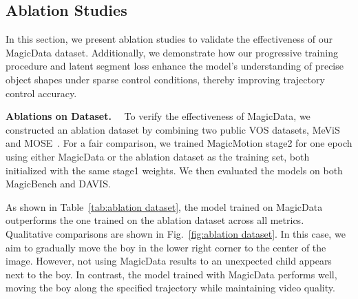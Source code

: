 \subsection{Ablation Studies}
In this section, we present ablation studies to validate the effectiveness of our MagicData dataset. Additionally, we demonstrate how our progressive training procedure and latent segment loss enhance the model’s understanding of precise object shapes under sparse control conditions, thereby improving trajectory control accuracy.

\vspace{0.2cm}
\noindent\textbf{Ablations on Dataset.}
~~To verify the effectiveness of MagicData, we constructed an ablation dataset by combining two public VOS datasets, MeViS~\cite{MeViS} and MOSE~\cite{MOSE}.
For a fair comparison, we trained MagicMotion stage2 for one epoch using either MagicData or the ablation dataset as the training set, both initialized with the same stage1 weights. We then evaluated the models on both MagicBench and DAVIS.

As shown in Table~\ref{tab:ablation dataset}, the model trained on MagicData outperforms the one trained on the ablation dataset across all metrics. Qualitative comparisons are shown in Fig.~\ref{fig:ablation dataset}. In this case, we aim to gradually move the boy in the lower right corner to the center of the image. However, not using MagicData results to an unexpected child appears next to the boy.
In contrast, the model trained with MagicData performs well, moving the boy along the specified trajectory while maintaining video quality.

\begin{table}[h]
\caption{Ablation Study on MagicData. The model trained with MagicData outperforms the one trained without it across all metrics.}
\label{tab:ablation dataset}
\end{table}

